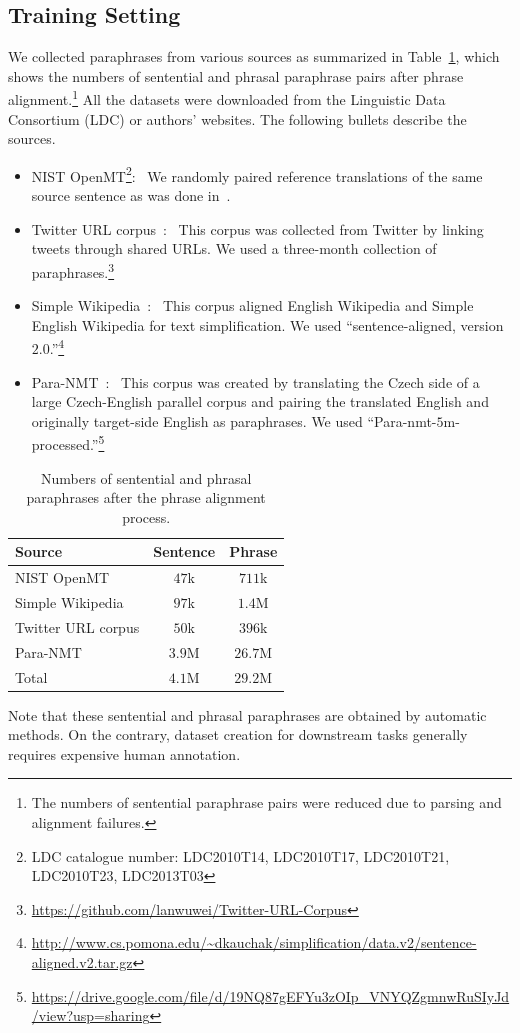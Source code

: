 \documentclass[11pt,a4paper]{article}
\newcommand{\Tref}[1]{Table~\ref{#1}}
\begin{document}
\subsection{Training Setting}
We collected paraphrases from various sources as summarized in \Tref{tb:paraphrase_corpus}, which shows the numbers of sentential and phrasal paraphrase pairs after phrase alignment.\footnote{The numbers of sentential paraphrase pairs were reduced due to parsing and alignment failures.}
All the datasets were downloaded from the Linguistic Data Consortium (LDC) or authors' websites. 
The following bullets describe the sources.
{
\setlength{\leftmargini}{15pt}
\begin{itemize}
\setlength{\itemsep}{0pt}
\item NIST OpenMT\footnote{LDC catalogue number: LDC2010T14, LDC2010T17, LDC2010T21, LDC2010T23, LDC2013T03}:~
We randomly paired reference translations of the same source sentence as was done in~\cite{arase:emnlp2017}.
\item Twitter URL corpus~\cite{D17-1126}:~
This corpus was collected from Twitter by linking tweets through shared URLs. We used a three-month collection of paraphrases.\footnote{\url{https://github.com/lanwuwei/Twitter-URL-Corpus}}
\item Simple Wikipedia~\cite{P13-1151}:~
This corpus aligned English Wikipedia and Simple English Wikipedia for text simplification. 
We used ``sentence-aligned, version $2.0$.''\footnote{\url{http://www.cs.pomona.edu/~dkauchak/simplification/data.v2/sentence-aligned.v2.tar.gz}}
\item Para-NMT~\cite{P18-1042}:~
This corpus was created by translating the Czech side of a large Czech-English parallel corpus and pairing the translated English and originally target-side English as paraphrases. 
We used ``Para-nmt-$5$m-processed.''\footnote{\url{https://drive.google.com/file/d/19NQ87gEFYu3zOIp_VNYQZgmnwRuSIyJd/view?usp=sharing}}
\end{itemize}
}

\begin{table}[!t]
\centering
\begin{tabular}{  l | c | c }
\hline
	Source & Sentence & Phrase \\ \hline
	NIST OpenMT & $47$k & $711$k  \\
	Simple Wikipedia & $97$k & $1.4$M \\ 
	Twitter URL corpus & $50$k & $396$k \\
	Para-NMT & $3.9$M & $26.7$M \\ \hline
	Total & $4.1$M & $29.2$M  \\\hline
\end{tabular}
\caption{Numbers of sentential and phrasal paraphrases after the phrase alignment process.}
\label{tb:paraphrase_corpus}
\end{table}
\noindent
Note that these sentential and phrasal paraphrases are obtained by automatic methods. 
On the contrary, dataset creation for downstream tasks generally requires expensive human annotation. 
\end{document}
